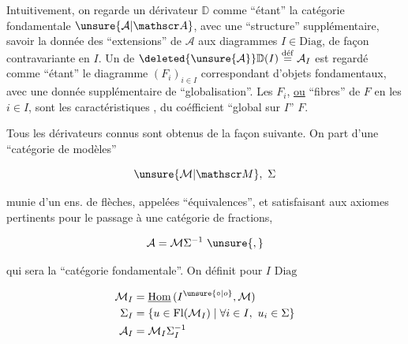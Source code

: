 
\margin{$\times$}

Intuitivement, on regarde un dérivateur $\mathbb D$ comme ``étant'' la catégorie fondamentale $\unsure{\mathcal A|\mathscr A}$, avec une ``structure'' supplémentaire, savoir la donnée des ``extensions'' de $\mathcal A$ \margin{$\longrightarrow$} aux diagrammes $I\in\mathrm{Diag}$, de façon contravariante en $I$. Un  de $\deleted{\unsure{\mathcal A}}\mathbb D(I)\overset{\mathrm{d\acute ef}}{=}\mathcal A_{I}$ est regardé comme ``étant'' le diagramme $(F_{i})_{i\in I}$ correspondant d'objets fondamentaux, avec une donnée supplémentaire de ``globalisation''. Les $F_{i}$,  \uline{ou} ``fibres'' de $F$ en les $i\in I$, sont les caractéristiques , du coéfficient ``global sur $I$'' $F$.


Tous les dérivateurs connus sont obtenus de la façon  suivante. On part d'une ``catégorie de modèles''

\[
\unsure{\mathcal M|\mathscr M},\ \Sigma
\]

munie d'un ens. de flèches, appelées ``équivalences'', et satisfaisant aux axiomes pertinents pour le passage à une catégorie de fractions,

\[
\mathcal A=\mathcal M\Sigma^{-1}\ \unsure{,}
\]

qui sera la ``catégorie fondamentale''. On définit pour  $I$  $\mathrm{Diag}$

\[
\begin{aligned}
\mathcal M_{I}&=\underline{\mathrm{Hom}}\,(I^{\unsure{\circ|o}},\mathcal M)\\
\Sigma_{I}&=\{u\in\mathrm{Fl}(\mathcal M_{I})\mid\forall i\in I,\ u_{i}\in\Sigma\}\\
\mathcal A_{I}&=\mathcal M_{I}\Sigma_{I}^{-1}
\end{aligned}
\]

